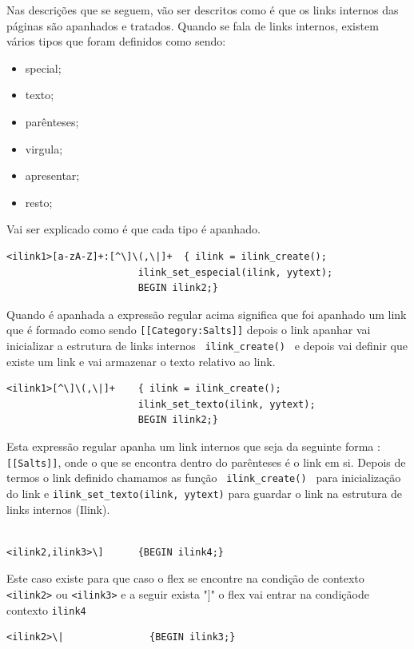 \documentclass[11pt, a4paper, oneside]{article}
\begin{document}
Nas descrições que se seguem, vão ser descritos como é que os links internos das páginas são apanhados e tratados.
Quando se fala de links internos, existem vários tipos que foram definidos como sendo:
\begin{itemize}
\item special;
\item texto;
\item parênteses;
\item virgula;
\item apresentar;
\item resto;
\end{itemize}


Vai ser explicado como é que cada tipo é apanhado.

\begin{verbatim}
<ilink1>[a-zA-Z]+:[^\]\(,\|]+  { ilink = ilink_create();
                       ilink_set_especial(ilink, yytext); 
                       BEGIN ilink2;}
\end{verbatim}


Quando é apanhada a expressão regular acima significa que foi apanhado um link que é formado como sendo \texttt{[[Category:Salts]]} depois o link apanhar vai inicializar a estrutura de links internos \texttt{ ilink\_create() } e depois vai definir que existe um link e vai armazenar o texto relativo ao link.

\begin{verbatim}
<ilink1>[^\]\(,\|]+    { ilink = ilink_create();
                       ilink_set_texto(ilink, yytext);
                       BEGIN ilink2;}
\end{verbatim}
Esta expressão regular apanha um link internos que seja da seguinte forma :\texttt{[[Salts]]}, onde o que se encontra dentro do parênteses é o link em si. Depois de termos o link definido chamamos as função \texttt{ ilink\_create() } para inicialização do link e  \texttt{ilink\_set\_texto(ilink, yytext)} para guardar o link na estrutura de links internos (Ilink).


\begin{verbatim}

<ilink2,ilink3>\]      {BEGIN ilink4;}
\end{verbatim}
Este caso existe para que caso o flex se encontre na condição de contexto \texttt{<ilink2>} ou \texttt{<ilink3>} e a seguir exista "]" o flex vai entrar na condiçãode contexto \texttt{ilink4}


\begin{verbatim}
<ilink2>\|               {BEGIN ilink3;}
\end{verbatim}
\end{document}
